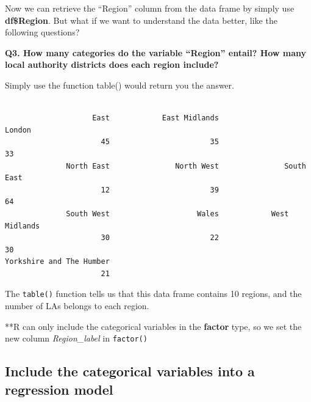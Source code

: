 \documentclass[
  letterpaper,
  DIV=11,
  numbers=noendperiod]{scrreprt}
\newenvironment{Shaded}{\begin{snugshade}}{\end{snugshade}}
\newcommand{\FunctionTok}[1]{\textcolor[rgb]{0.28,0.35,0.67}{#1}}
\newcommand{\NormalTok}[1]{\textcolor[rgb]{0.00,0.23,0.31}{#1}}
\newcommand{\OtherTok}[1]{\textcolor[rgb]{0.00,0.23,0.31}{#1}}
\newcommand{\SpecialCharTok}[1]{\textcolor[rgb]{0.37,0.37,0.37}{#1}}
\begin{document}
Now we can retrieve the ``Region'' column from the data frame by simply
use \textbf{df\$Region}. But what if we want to understand the data
better, like the following questions?

\textbf{Q3. How many categories do the variable ``Region'' entail? How
many local authority districts does each region include?}

Simply use the function table() would return you the answer.

\begin{Shaded}
\end{Shaded}

\begin{verbatim}

                    East            East Midlands                   London 
                      45                       35                       33 
              North East               North West               South East 
                      12                       39                       64 
              South West                    Wales            West Midlands 
                      30                       22                       30 
Yorkshire and The Humber 
                      21 
\end{verbatim}

The \texttt{table()} function tells us that this data frame contains 10
regions, and the number of LAs belongs to each region.

**R can only include the categorical variables in the \textbf{factor}
type, so we set the new column \emph{Region\_label} in \texttt{factor()}

\begin{Shaded}
\end{Shaded}

\subsection{\texorpdfstring{\textbf{Include the categorical variables
into a regression
model}}{Include the categorical variables into a regression model}}\label{include-the-categorical-variables-into-a-regression-model}
\end{document}

